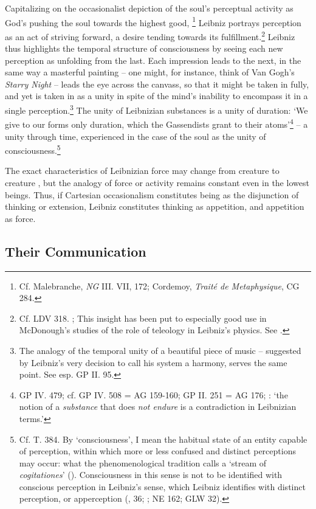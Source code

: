 \documentclass{article}
\begin{document}
Capitalizing on the occasionalist depiction of the soul's perceptual
activity as God's pushing the soul towards the highest good, \footnote{Cf.
  Malebranche, \emph{NG} III. VII, 172; Cordemoy, \emph{Traité de
  Metaphysique}, CG 284.} Leibniz portrays perception as an act of
striving forward, a desire tending towards its fulfillment.\footnote{Cf.
  LDV 318. \autocite{Jorgensen2015}; This insight has been put to especially good
  use in McDonough's studies of the role of teleology in Leibniz's
  physics. See \autocite{McDonough2009,McDonough2016}.} Leibniz thus highlights the
temporal structure of consciousness by seeing each new perception as
unfolding from the last. Each impression leads to the next, in the same
way a masterful painting -- one might, for instance, think of Van Gogh's
\emph{Starry Night} -- leads the eye across the canvass, so that it
might be taken in fully, and yet is taken in as a unity in spite of the
mind's inability to encompass it in a single perception.\footnote{The
  analogy of the temporal unity of a beautiful piece of music --
  suggested by Leibniz's very decision to call his system a harmony,
  serves the same point. See esp. GP II. 95.} The unity of Leibnizian
substances is a unity of duration: `We give to our forms only duration,
which the Gassendists grant to their atoms'\footnote{GP IV. 479; cf. GP
  IV. 508 = AG 159-160; GP II. 251 = AG 176; \autocite[870]{Whipple2010}: `the
  notion of a \emph{substance} that does \emph{not endure} is a
  contradiction in Leibnizian terms.'} -- a unity through time,
experienced in the case of the soul as the unity of
consciousness.\footnote{Cf. T. 384. By `consciousness', I mean the
  habitual state of an entity capable of perception, within which more
  or less confused and distinct perceptions may occur: what the
  phenomenological tradition calls a `stream of \emph{cogitationes}'
  (\autocite[31-33]{Husserl1960}). Consciousness in this sense is not to be
  identified with conscious perception in Leibniz's sense, which Leibniz
  identifies with distinct perception, or apperception (\autocite[36]{McRae1976}, 36;
  \autocite[53]{Simmons2001}; NE 162; GLW 32).}

The exact characteristics of Leibnizian force may change from creature
to creature , but the analogy of force or activity remains constant even
in the lowest beings. Thus, if Cartesian occasionalism constitutes being
as the disjunction of thinking or extension, Leibniz constitutes
thinking as appetition, and appetition as force.

\subsection{Their Communication}
\end{document}
